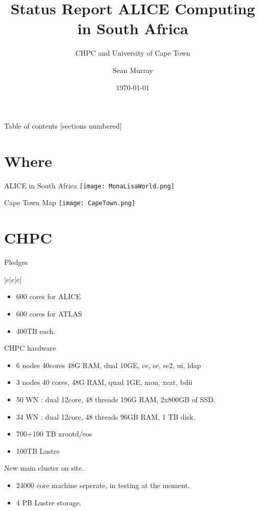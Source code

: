 \documentclass[10pt]{beamer}
\title{Status Report ALICE Computing in South Africa}
\subtitle{CHPC and University of Cape Town}
\date{\today}
\author{Sean Murray}
\institute{UCT/CHPC}
\begin{document}
\maketitle

\begin{frame}{Table of contents}
  [sections numbered]
  \tableofcontents[hideallsubsections]
\end{frame}



\section{Where}

\begin{frame}{ALICE in South Africa}
  \texttt{[image: MonaLisaWorld.png]}
\end{frame}
\begin{frame}{Cape Town Map}
  \texttt{[image: CapeTown.png]}
\end{frame}


\section{CHPC}
\begin{frame}{Pledges}
    \begin{tabular}
        \begin{table}{|c|c|c|}

        \end{table}
    \end{tabular}
  \begin{itemize}
  \item 600 cores for ALICE
  \item 600 cores for ATLAS
  \item 400TB each.
  \end{itemize}
\end{frame}
%

\begin{frame}{CHPC hardware}
  \begin{itemize}
      \item 6 nodes 40cores 48G RAM, dual 10GE, ce, se, se2, ui, ldap
      \item 3 nodes 40 cores, 48G RAM, quad 1GE, mon, xcat, bdii 
      \item 50 WN : dual 12core, 48 threads 196G RAM, 2x800GB of SSD.
      \item 34 WN : dual 12core, 48 threads 96GB RAM, 1 TB disk.
      \item 700+100 TB xrootd/eos
      \item 100TB Lustre
    \end{itemize}
    New main cluster on site.
    \begin{itemize}
      \item 24000 core machine seperate, in testing at the moment.
      \item 4 PB Lustre storage.
    \end{itemize}
 \end{frame}
\end{document}
